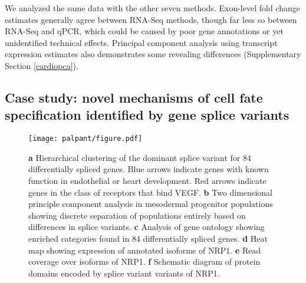 \documentclass[twocolumn]{article}
\begin{document}
We analyzed the same data with the other seven methods. Exon-level fold change
estimates generally agree between RNA-Seq methods, though far less so between
RNA-Seq and qPCR, which could be caused by poor gene annotations or yet
unidentified technical effects. Principal component analysis using transcript
expression estimates also demonstrates some revealing differences (Supplementary
Section \ref{cardiopca}).

\subsection{Case study: novel mechanisms of cell fate specification identified
by gene splice variants}\label{novel-mechanisms-of-cell-fate}

\begin{figure*}
\begin{center}
\texttt{[image: palpant/figure.pdf]}
\end{center}
\caption{
\textbf{a}
Hierarchical clustering of the dominant splice variant for 84
differentially spliced genes. Blue arrows indicate genes with known function in
endothelial or heart development. Red arrows indicate genes in the class of
receptors that bind VEGF.
\textbf{b}
Two dimensional principle component analysis in mesodermal progenitor
populations showing discrete separation of populations entirely based on
differences in splice variants.
\textbf{c}
Analysis of gene ontology showing enriched categories found in 84 differentially
spliced genes.
\textbf{d}
Heat map showing expression of annotated isoforms of NRP1.
\textbf{e}
Read coverage over isoforms of NRP1.
\textbf{f}
Schematic diagram of protein domains encoded by splice variant variants of NRP1.}
\label{fig:mesodermal}
\end{figure*}
\end{document}
